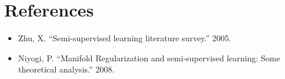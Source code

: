 \documentclass[11pt]{article}
\begin{document}
\section{References}

\begin{itemize}
\item Zhu, X.  ``Semi-supervised learning literature survey.'' 2005.
\item Niyogi, P.  ``Manifold Regularization and semi-supervised learning:
Some theoretical analysis.''  2008.
\end{itemize}
\end{document}
